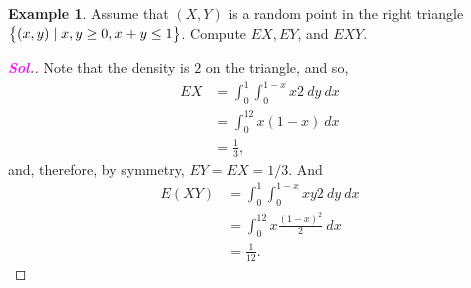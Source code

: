 \documentclass[12pt,a4paper]{article}
\theoremstyle{definition}
\newtheorem{example}{Example}[section]
\theoremstyle{definition}
\theoremstyle{definition}
\theoremstyle{definition}
\theoremstyle{remark}
\theoremstyle{definition}
\newcommand{\sol}{\textcolor{magenta}{\bf \textit{Sol.}}\quad}
\begin{document}
\begin{example}
	Assume that $(X,Y)$ is a random point in the right triangle $\set{(x,y)\mid x,y\geq 0, x+y\leq 1}$. Compute $EX, EY$, and $EXY$.\begin{proof}[\sol]
		Note that the density is $2$ on the triangle, and so, \begin{align*}
		EX&=\int_0^1\int_0^{1-x}x2\ dy\ dx\\
		&=\int_0^12x(1-x)\ dx\\
		&=\frac{1}{3},
		\end{align*} and, therefore, by symmetry, $EY=EX=1/3$. And \begin{align*}
		E(XY)&=\int_0^1\int_0^{1-x}xy2\ dy\ dx\\
		&=\int_0^12x\frac{(1-x)^2}{2}\ dx\\
		&=\frac{1}{12}.
		\end{align*}
	\end{proof}
\end{example}
\end{document}
